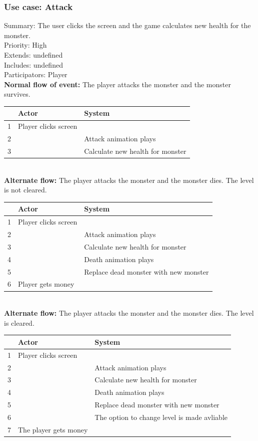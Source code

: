 \documentclass{article}
\begin{document}
\subsubsection{Use case: Attack}
Summary: The user clicks the screen and the game calculates new health for the monster.\\
Priority: High\\
Extends: undefined\\
Includes: undefined\\
Participators: Player\\
\textbf{Normal flow of event:} The player attacks the monster and the monster survives.
\vspace{1 mm}\\
\begin{tabular}{|c|l|l|} \hline
  & Actor & System \\ \hline
1 & Player clicks screen & \\ \hline
2 & & Attack animation plays \\ \hline
3 & & Calculate new health for monster\\ \hline
\end{tabular}\\
\newpage
\noindent
\textbf{Alternate flow:} The player attacks the monster and the monster dies. The level is not cleared.
\vspace{1 mm}\\
\begin{tabular}{|c|l|l|} \hline
    & Actor & System \\ \hline
    1 & Player clicks screen & \\ \hline
    2 & & Attack animation plays \\ \hline
    3 & & Calculate new health for monster\\ \hline
    4 & & Death animation plays \\ \hline 
    5 & & Replace dead monster with new monster \\ \hline
    6 & Player gets money & \\ \hline
\end{tabular}
\vspace{5 mm}\\
\textbf{Alternate flow:} The player attacks the monster and the monster dies. The level is cleared.
\vspace{1 mm}\\
\begin{tabular}{| c | l | l |} \hline
    & Actor & System \\ \hline
    1 & Player clicks screen & \\ \hline
    2 & & Attack animation plays \\ \hline
    3 & & Calculate new health for monster\\ \hline
    4 & & Death animation plays \\ \hline 
    5 & & Replace dead monster with new monster \\ \hline
    6 & & The option to change level is made avliable\\ \hline
    7 & The player gets money & \\ \hline
\end{tabular}
\\
\end{document}
